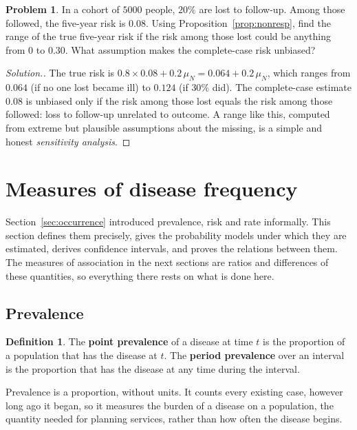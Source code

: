 \documentclass[11pt,a4paper]{article}
\numberwithin{equation}{section}
\theoremstyle{definition}
\newtheorem{defn}[thm]{Definition}
\newtheorem{problemx}{Problem}[subsection]
\newenvironment{problem}{\begin{problemx}}{\end{problemx}}
\newenvironment{solution}
  {\renewcommand{\qedsymbol}{}\begin{proof}[\textit{Solution}.]}
  {\end{proof}}
\begin{document}
\begin{problem}
In a cohort of $5000$ people, $20\%$ are lost to follow-up. Among those followed, the five-year risk is $0.08$. Using
Proposition~\ref{prop:nonresp}, find the range of the true five-year risk if the risk among those lost could be anything from $0$ to $0.30$.
What assumption makes the complete-case risk unbiased?
\end{problem}

\begin{solution}
The true risk is $0.8 \times 0.08 + 0.2\,\mu_N = 0.064 + 0.2\,\mu_N$, which ranges from $0.064$ (if no one lost became ill) to $0.124$ (if $30\%$ did). The
complete-case estimate $0.08$ is unbiased only if the risk among those lost equals the risk among those followed: loss to follow-up
unrelated to outcome. A range like this, computed from extreme but plausible assumptions about the missing, is a simple and honest
\emph{sensitivity analysis}.
\end{solution}

\section{Measures of disease frequency}
\label{sec:frequency}

Section~\ref{sec:occurrence} introduced prevalence, risk and rate informally. This section defines them precisely, gives the
probability models under which they are estimated, derives confidence intervals, and proves the relations between them. The measures
of association in the next sections are ratios and differences of these quantities, so everything there rests on what is done here.

\subsection{Prevalence}
\label{sec:prevalence}

\begin{defn}
The \textbf{point prevalence} of a disease at time $t$ is the proportion of a population that has the disease at $t$. The \textbf{period
prevalence} over an interval is the proportion that has the disease at any time during the interval.
\end{defn}

Prevalence is a proportion, without units. It counts every existing case, however long ago it began, so it measures the burden of a
disease on a population, the quantity needed for planning services, rather than how often the disease begins.
\end{document}

